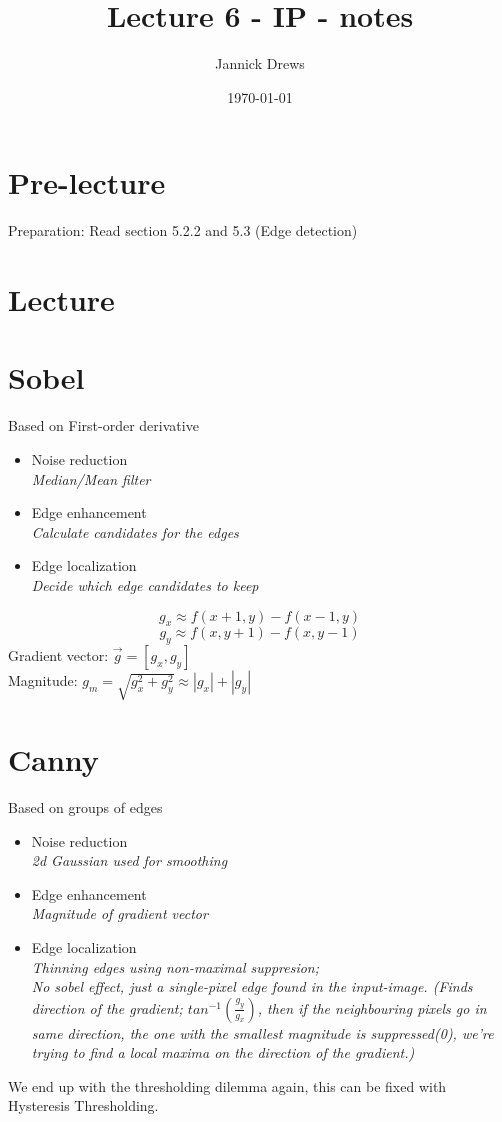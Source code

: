 \documentclass{article}
\title{ Lecture 6 - IP - notes }
\author{Jannick Drews}
\date{\today}
\begin{document}
\maketitle
\newpage

\section{Pre-lecture}
Preparation: Read section 5.2.2 and 5.3 (Edge detection)\\

\section{Lecture}
\section{Sobel}
Based on First-order derivative
\begin{itemize}
  \item Noise reduction\\
    \textit{Median/Mean filter}
  \item Edge enhancement\\
    \textit{Calculate candidates for the edges}
  \item Edge localization\\
    \textit{Decide which edge candidates to keep}
\end{itemize}
$$ g_x \approx f(x+1, y) - f(x-1, y)$$
$$ g_y \approx f(x, y+1) - f(x, y-1)$$
Gradient vector: $\vec{g} = [g_x, g_y]$\\
Magnitude: $g_m = \sqrt{g_x^2 + g_y^2} \approx |g_x|+|g_y|$\\

\section{Canny}
Based on groups of edges
\begin{itemize}
  \item Noise reduction\\
    \textit{2d Gaussian used for smoothing}
  \item Edge enhancement\\
    \textit{Magnitude of gradient vector}
  \item Edge localization\\
    \textit{Thinning edges using non-maximal suppresion;\\No sobel effect, just a single-pixel edge found in the input-image. (Finds direction of the gradient; $tan^{-1}(\frac{g_y}{g_x})$, then if the neighbouring pixels go in same direction, the one with the smallest magnitude is suppressed(0), we're trying to find a local maxima on the direction of the gradient.)}
\end{itemize}
We end up with the thresholding dilemma again, this can be fixed with Hysteresis Thresholding.\\
\end{document}
